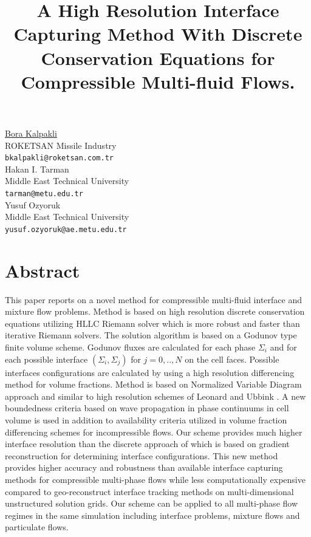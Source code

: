 \documentclass[article, A4, 11pt]{llncs}%
\begin{document}
\title{A High Resolution Interface Capturing Method With Discrete Conservation Equations for Compressible Multi-fluid Flows.}
 \author{} \institute{}
\maketitle
\begin{center}
{\large \underline{Bora Kalpakli}}\\
ROKETSAN Missile Industry\\
{\tt bkalpakli@roketsan.com.tr}
\\ \vspace{4mm}
{\large Hakan I.  Tarman}\\
Middle East Technical University\\
{\tt tarman@metu.edu.tr}
\\ \vspace{4mm}
{\large Yusuf Ozyoruk}\\
Middle East Technical University\\
{\tt yusuf.ozyoruk@ae.metu.edu.tr}
\end{center}

\section*{Abstract}
This paper reports on a novel method for compressible multi-fluid interface and mixture flow problems. Method is based on high resolution discrete conservation equations utilizing HLLC Riemann solver which is more robust and faster than iterative Riemann solvers. The solution algorithm is based on a Godunov type finite volume scheme. Godunov fluxes are calculated for each phase $\Sigma_i$ and for each possible interface $\left(\Sigma_i,\Sigma_j\right)$ for $j=0,..,N$ on the cell faces. Possible interfaces configurations are calculated by using a high resolution differencing method for volume fractions. Method is based on Normalized Variable Diagram approach and similar to high resolution schemes of Leonard \cite{The ULTIMATE conservative difference scheme applied to unsteady one-dimensional advection.} and Ubbink \cite{Numerical prediction of two fluid systems with sharp interfaces}. A new boundedness criteria based on wave propagation in phase continuums in cell volume is used in addition to availability criteria utilized  in volume fraction differencing schemes for incompressible flows. Our scheme provides  much higher interface resolution than the discrete  approach of \cite{Discrete equations for physical and numerical compressible multiphase mixtures} which is based on gradient reconstruction for determining interface configurations. This new method provides higher accuracy and robustness than available interface capturing methods for compressible multi-phase flows while less computationally expensive compared to geo-reconstruct interface tracking methods on multi-dimensional unstructured solution grids. Our scheme can be applied to all multi-phase flow regimes in the same simulation including interface problems, mixture flows and particulate flows.
\end{document}
